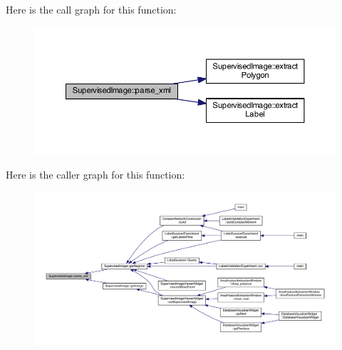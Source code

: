 Here is the call graph for this function\+:\nopagebreak
\begin{figure}[H]
\begin{center}
\leavevmode
\includegraphics[width=350pt]{class_supervised_image_ae351771d19a2bbd53c88e871ed5bb4de_cgraph}
\end{center}
\end{figure}




Here is the caller graph for this function\+:
\nopagebreak
\begin{figure}[H]
\begin{center}
\leavevmode
\includegraphics[width=350pt]{class_supervised_image_ae351771d19a2bbd53c88e871ed5bb4de_icgraph}
\end{center}
\end{figure}




